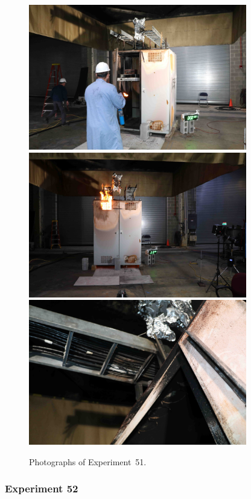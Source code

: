 \begin{figure}[p]
\centering
\includegraphics[height=2.50in]{../FIGURES/Test_51_setup} \\
\includegraphics[height=2.50in]{../FIGURES/Test_51_ignition} \\
\includegraphics[height=2.50in]{../FIGURES/Test_51_scar}
\caption[Photographs of Experiment~51]{Photographs of Experiment~51.}
\label{fig:Test_51_photos}
\end{figure}


\clearpage

\subsubsection{Experiment 52}


